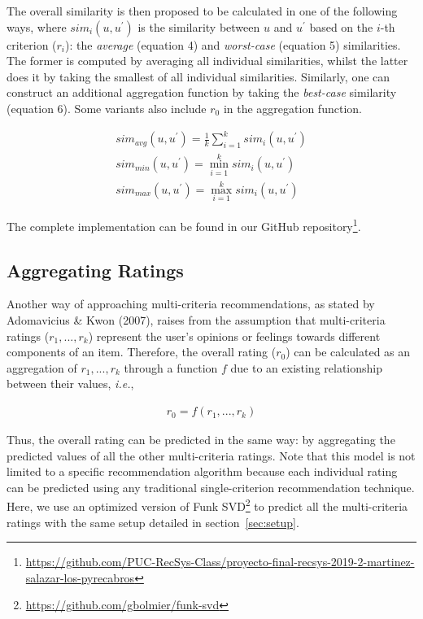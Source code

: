 \documentclass[sigconf,authordraft]{acmart}
\begin{document}
The overall similarity is then proposed to be calculated in one of the following ways, where $sim_i (u, u^\prime)$ is the similarity between $u$ and $u^\prime$ based on the $i$-th criterion ($r_i$): the \textit{average} (equation 4) and \textit{worst-case} (equation 5) similarities. The former is computed by averaging all individual similarities, whilst the latter does it by taking the smallest of all individual similarities. Similarly, one can construct an additional aggregation function by taking the \textit{best-case} similarity (equation 6). Some variants also include $r_0$ in the aggregation function.

\begin{align}
    sim_{avg} (u, u^\prime) = \frac{1}{k} \sum_{i=1}^k sim_i (u, u^\prime) \\
    sim_{min} (u, u^\prime) = \min_{i=1}^k sim_i (u, u^\prime) \\
    sim_{max} (u, u^\prime) = \max_{i=1}^k sim_i (u, u^\prime)
\end{align}

The complete implementation can be found in our GitHub repository\footnote{\label{foot:our-repo}\url{https://github.com/PUC-RecSys-Class/proyecto-final-recsys-2019-2-martinez-salazar-los-pyrecabros}}.

\subsection{Aggregating Ratings}
\label{sec:ratings}

Another way of approaching multi-criteria recommendations, as stated by Adomavicius \& Kwon (2007), raises from the assumption that multi-criteria ratings ($r_1, ..., r_k$) represent the user's opinions or feelings towards different components of an item. Therefore, the overall rating ($r_0$) can be calculated as an aggregation of $r_1, ..., r_k$ through a function $f$ due to an existing relationship between their values, \textit{i.e.},

\begin{align}
    r_0 = f (r_1, ..., r_k)
\end{align}

Thus, the overall rating can be predicted in the same way: by aggregating the predicted values of all the other multi-criteria ratings. Note that this model is not limited to a specific recommendation algorithm because each individual rating can be predicted using any traditional single-criterion recommendation technique. Here, we use an optimized version of Funk SVD\footnote{\label{foot:funksvd}\url{https://github.com/gbolmier/funk-svd}} to predict all the multi-criteria ratings with the same setup detailed in section~\ref{sec:setup}.
\end{document}
